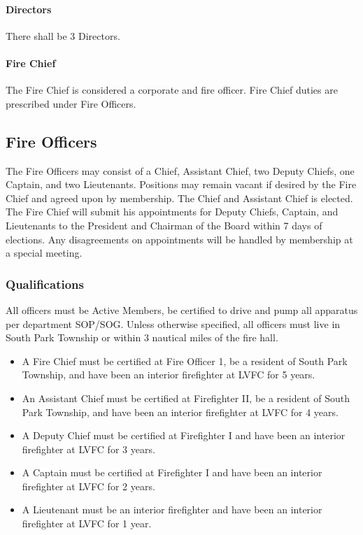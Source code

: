 ﻿\documentclass[12pt,letterpaper]{article}
\begin{document}
\paragraph{Directors}
There shall be 3 Directors.
\paragraph{Fire Chief}
The Fire Chief is considered a corporate and fire officer.  Fire Chief duties are prescribed under Fire Officers.

\subsection{Fire Officers}
The Fire Officers may consist of a Chief, Assistant Chief, two Deputy Chiefs, one Captain, and two Lieutenants.  Positions may remain vacant if desired by the Fire Chief and agreed upon by membership.  The Chief and Assistant Chief is elected.  The Fire Chief will submit his appointments for Deputy Chiefs, Captain, and Lieutenants to the President and Chairman of the Board within 7 days of elections.  Any disagreements on appointments will be handled by membership at a special meeting.

\subsubsection{Qualifications}
All officers must be Active Members, be certified to drive and pump all apparatus per department SOP/SOG.  Unless otherwise specified, all officers must live in South Park Township or within 3 nautical miles of the fire hall.
\begin{itemize}
\item A Fire Chief must be certified at Fire Officer 1, be a resident of South Park Township, and have been an interior firefighter at LVFC for 5 years.
\item An Assistant Chief must be certified at Firefighter II, be a resident of South Park Township, and have been an interior firefighter at LVFC for 4 years.
\item A Deputy Chief must be certified at Firefighter I and have been an interior firefighter at LVFC for 3 years.
\item A Captain must be certified at Firefighter I and have been an interior firefighter at LVFC for 2 years.
\item A Lieutenant must be an interior firefighter and have been an interior firefighter at LVFC for 1 year.
\end{itemize}
\end{document}
